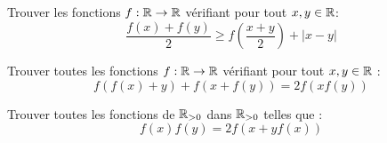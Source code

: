 \begin{exo}
Trouver les fonctions $f:\mathbb R\rightarrow \mathbb R$ vérifiant pour tout $x,y\in \mathbb R$:
$$\frac{f(x)+f(y)}{2}\ge f\left(\frac{x+y}{2}\right)+|x-y|$$
\end{exo}




\begin{exo} %
Trouver toutes les fonctions $f : \mathbb R\rightarrow \mathbb R$ vérifiant pour tout $x,y\in \mathbb R$ :
$$f(f(x)+y)+f(x+f(y))=2f(xf(y))$$
\end{exo}






\begin{exo}
Trouver toutes les fonctions de $\mathbb R_{>0}$ dans $\mathbb R_{>0}$ telles que :
$$f(x)f(y)=2f(x+yf(x))$$
\end{exo}

